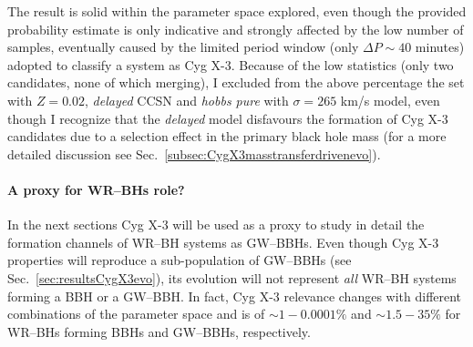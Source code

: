 \documentclass[a4paper,titlepage]{book}     	%
\begin{document}
The result is solid within the parameter space explored, even though the provided probability estimate is only indicative and strongly affected by the low number of samples, eventually caused by the limited period window (only $\Delta P \sim 40$ minutes) adopted to classify a system as Cyg X-3. Because of the low statistics (only two candidates, none of which merging), I excluded from the above percentage the set with $Z=0.02$, \emph{delayed} CCSN and \emph{hobbs pure} with $\sigma=265$ km/s model, even though I recognize that the \emph{delayed} model disfavours the formation of Cyg X-3 candidates due to a selection effect in the primary black hole mass (for a more detailed discussion see Sec.\ \ref{subsec:CygX3masstransferdrivenevo}).

\paragraph{A proxy for WR--BHs role?} In the next sections Cyg X-3 will be used as a proxy to study in detail the formation channels of WR--BH systems as GW--BBHs. Even though Cyg X-3 properties will reproduce a sub-population of GW--BBHs (see Sec.\ \ref{sec:resultsCygX3evo}), its evolution will not represent \emph{all} WR--BH systems forming a BBH or a GW--BBH. In fact, Cyg X-3 relevance changes with different combinations of the parameter space and is of $\sim 1-0.0001\%$  and  $\sim 1.5 - 35 \%$ for WR--BHs forming BBHs and GW--BBHs, respectively.
\end{document}
